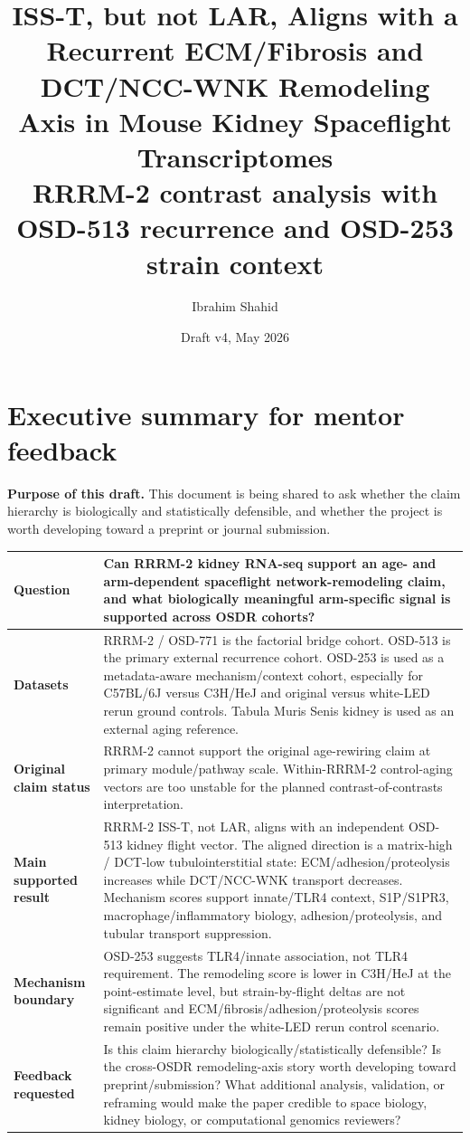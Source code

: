 \documentclass[11pt]{article}
\title{\textbf{ISS-T, but not LAR, Aligns with a Recurrent ECM/Fibrosis and DCT/NCC-WNK Remodeling Axis in Mouse Kidney Spaceflight Transcriptomes}\\[0.35em]
\large RRRM-2 contrast analysis with OSD-513 recurrence and OSD-253 strain context}
\author{Ibrahim Shahid}
\affil{Independent research draft for mentor feedback\\Authorship/collaboration structure pending}
\date{Draft v4, May 2026}
\begin{document}
\maketitle

\section*{Executive summary for mentor feedback}

\noindent\textbf{Purpose of this draft.} This document is being shared to ask whether the claim hierarchy is biologically and statistically defensible, and whether the project is worth developing toward a preprint or journal submission.

\vspace{0.6em}
\small
\begin{tabularx}{\textwidth}{>{\bfseries}p{}X}
\toprule
Question & Can RRRM-2 kidney RNA-seq support an age- and arm-dependent spaceflight network-remodeling claim, and what biologically meaningful arm-specific signal is supported across OSDR cohorts? \\
\midrule
Datasets & RRRM-2 / OSD-771 is the factorial bridge cohort. OSD-513 is the primary external recurrence cohort. OSD-253 is used as a metadata-aware mechanism/context cohort, especially for C57BL/6J versus C3H/HeJ and original versus white-LED rerun ground controls. Tabula Muris Senis kidney is used as an external aging reference. \\
\midrule
Original claim status & RRRM-2 cannot support the original age-rewiring claim at primary module/pathway scale. Within-RRRM-2 control-aging vectors are too unstable for the planned contrast-of-contrasts interpretation. \\
\midrule
Main supported result & RRRM-2 ISS-T, not LAR, aligns with an independent OSD-513 kidney flight vector. The aligned direction is a matrix-high / DCT-low tubulointerstitial state: ECM/adhesion/proteolysis increases while DCT/NCC-WNK transport decreases. Mechanism scores support innate/TLR4 context, S1P/S1PR3, macrophage/inflammatory biology, adhesion/proteolysis, and tubular transport suppression. \\
\midrule
Mechanism boundary & OSD-253 suggests TLR4/innate association, not TLR4 requirement. The remodeling score is lower in C3H/HeJ at the point-estimate level, but strain-by-flight deltas are not significant and ECM/fibrosis/adhesion/proteolysis scores remain positive under the white-LED rerun control scenario. \\
\midrule
Feedback requested & Is this claim hierarchy biologically/statistically defensible? Is the cross-OSDR remodeling-axis story worth developing toward preprint/submission? What additional analysis, validation, or reframing would make the paper credible to space biology, kidney biology, or computational genomics reviewers? \\
\bottomrule
\end{tabularx}
\normalsize
\end{document}
